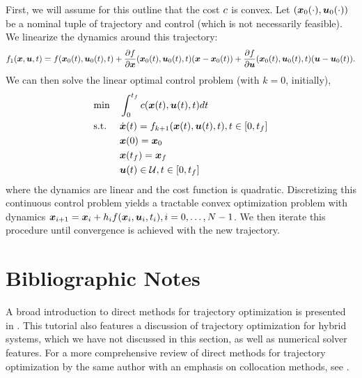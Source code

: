 First, we will assume for this outline that the cost $c$ is convex. Let $(\bm{x}_0(\cdot),\bm{u}_0(\cdot))$ be a nominal tuple of trajectory and control (which is not necessarily feasible). We linearize the dynamics around this trajectory:
\begin{equation}
    f_1(\bm{x},\bm{u},t) = f(\bm{x}_0(t),\bm{u}_0(t),t) + \frac{\partial f}{\partial \bm{x}}(\bm{x}_0(t), \bm{u}_0(t), t) (\bm{x} - \bm{x}_0(t)) + \frac{\partial f}{\partial \bm{u}}(\bm{x}_0(t), \bm{u}_0(t), t) (\bm{u} - \bm{u}_0(t)).
\end{equation}
We can then solve the linear optimal control problem (with $k=0$, initially),
\begin{equation}
\begin{aligned}
\label{eq:ocp}
& {\min} & & \int_{0}^{t_f} c(\bm{x}(t),\bm{u}(t),t) dt\\
& \textrm{s.t.} & & \dot{\bm{x}}(t) = f_{k+1}(\bm{x}(t),\bm{u}(t),t), t \in [0,t_f]\\
& & & \bm{x}(0) = \bm{x}_0\\
& & & \bm{x}(t_f) = \bm{x}_f\\
& & & \bm{u}(t) \in \mathcal{U}, t \in [0,t_f]
\end{aligned}
\end{equation}
where the dynamics are linear and the cost function is quadratic. Discretizing this continuous control problem yields a tractable convex optimization problem with dynamics $\bm{x}_{i+1} = \bm{x}_i + h_i f(\bm{x}_i,\bm{u}_i,t_i), i=0, \ldots, N-1$. We then iterate this procedure until convergence is achieved with the new trajectory.




\section{Bibliographic Notes}

A broad introduction to direct methods for trajectory optimization is presented in \cite{kelly2017transcription}. This tutorial also features a discussion of trajectory optimization for hybrid systems, which we have not discussed in this section, as well as numerical solver features. For a more comprehensive review of direct methods for trajectory optimization by the same author with an emphasis on collocation methods, see \cite{kelly2017introduction}.